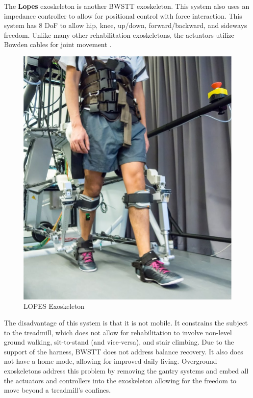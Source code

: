 The \textbf{Lopes} exoskeleton is another BWSTT exoskeleton. This system also uses an impedance controller to allow for positional control with force interaction. This system has 8 DoF to allow hip, knee, up/down, forward/backward, and sideways freedom. Unlike many other rehabilitation exoskeletons, the actuators utilize Bowden cables for joint movement \cite{veneman2007design}. 

\begin{figure}[H]
    \centering
    \includegraphics[scale=0.6]{images/background/A-subject-walking-with-LOPES-II-exoskeleton.jpg}
    \caption[LOPES Exoskeleton]{LOPES Exoskeleton \cite{lopes}}
    \label{fig:lopes}
\end{figure}


The disadvantage of this system is that it is not mobile. It constrains the subject to the treadmill, which does not allow for rehabilitation to involve non-level ground walking, sit-to-stand (and vice-versa), and stair climbing. Due to the support of the harness, BWSTT does not address balance recovery. It also does not have a home mode, allowing for improved daily living. Overground exoskeletons address this problem by removing the gantry systems and embed all the actuators and controllers into the exoskeleton allowing for the freedom to move beyond a treadmill's confines.


